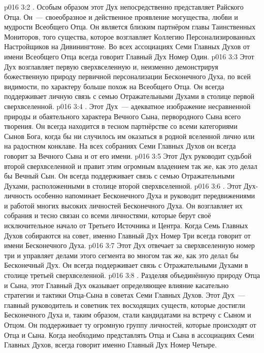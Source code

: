 \vs p016 3:2 . Особым образом этот Дух непосредственно представляет Райского Отца. Он~--- своеобразное и действенное проявление могущества, любви и мудрости Всеобщего Отца. Он является близким партнёром главы Таинственных Мониторов, того существа, которое возглавляет Коллегию Персонализированных Настройщиков на Дивинингтоне. Во всех ассоциациях Семи Главных Духов от имени Всеобщего Отца всегда говорит Главный Дух Номер Один.
\vs p016 3:3 Этот Дух возглавляет первую сверхвселенную и, неизменно демонстрируя божественную природу первичной персонализации Бесконечного Духа, по всей видимости, по характеру больше похож на Всеобщего Отца. Он всегда поддерживает личную связь с семью Отражательными Духами в столице первой сверхвселенной.
\vs p016 3:4 \pc {}. Этот Дух~--- адекватное изображение несравненной природы и обаятельного характера Вечного Сына, первородного Сына всего творения. Он всегда находится в тесном партнёрстве со всеми категориями Сынов Бога, когда бы ни случилось им оказаться в родной вселенной лично или на радостном конклаве. На всех собраниях Семи Главных Духов он всегда говорит за Вечного Сына и от его имени.
\vs p016 3:5 Этот Дух руководит судьбой второй сверхвселенной и правит этим огромным владением так же, как это делал бы Вечный Сын. Он всегда поддерживает связь с семью Отражательными Духами, расположенными в столице второй сверхвселенной.
\vs p016 3:6 \pc {}. Этот Дух\hyp{}личность особенно напоминает Бесконечного Духа и руководит передвижениями и работой многих высоких личностей Бесконечного Духа. Он возглавляет их собрания и тесно связан со всеми личностями, которые берут своё исключительное начало от Третьего Источника и Центра. Когда Семь Главных Духов собираются на совет, именно Главный Дух Номер Три всегда говорит от имени Бесконечного Духа.
\vs p016 3:7 Этот Дух отвечает за сверхвселенную номер три и управляет делами этого сегмента во многом так же, как это делал бы Бесконечный Дух. Он всегда поддерживает связь с Отражательными Духами в столице третьей сверхвселенной.
\vs p016 3:8 \pc {}. Разделяя объединённую природу Отца и Сына, этот Главный Дух оказывает определяющее влияние касательно стратегии и тактики Отца\hyp{}Сына в советах Семи Главных Духов. Этот Дух~--- главный руководитель и советник тех восходящих существ, которые достигли Бесконечного Духа и, таким образом, стали кандидатами на встречу с Сыном и Отцом. Он поддерживает ту огромную группу личностей, которые происходят от Отца и Сына. Когда необходимо представлять Отца и Сына в ассоциациях Семи Главных Духов, всегда говорит именно Главный Дух Номер Четыре.
